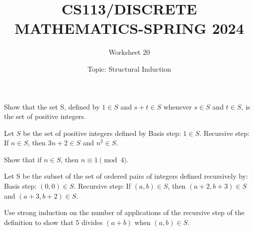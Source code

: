 \documentclass{exam}
\title{CS113/DISCRETE MATHEMATICS-SPRING 2024}
\author{Worksheet 20}
\date{Topic: Structural Induction}
\begin{document}
\maketitle

\begin{center}
\end{center}

\vspace{5mm}

\vspace{5mm}

\vspace{5mm}
\begin{questions}


\question Show that the set S, defined by $1 \in S$ and $s + t \in S$ whenever $s \in S$ and $t \in S$, is the set of positive integers.

\vspace{9in}

\question Let $S$ be the set of positive integers defined by
Basis step: $1 \in S$.
Recursive step: If $n \in S$, then $3n + 2 \in S$ and $n^2 \in S$.

Show that if $n \in S$, then $n \equiv 1 \pmod{4}$.
\vspace{9in}


\question
Let S be the subset of the set of ordered pairs of integers defined recursively by:
Basis step: $(0, 0) \in S$.
Recursive step: If $(a, b) \in S$, then $(a + 2, b + 3) \in S$ and $(a + 3, b + 2) \in S$.

Use strong induction on the number of applications of the recursive step of the definition to show that 5 divides $(a + b)$ when $(a, b) \in S$.



\end{questions}
\end{document}
